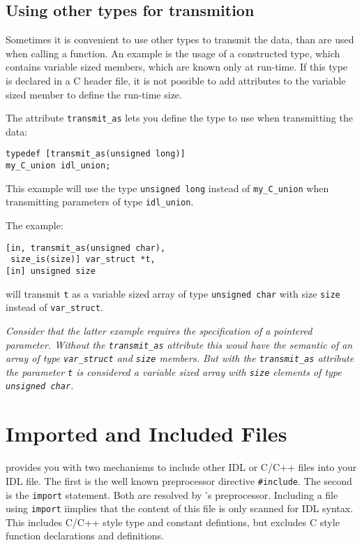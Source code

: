
\subsection{Using other types for transmition}
Sometimes it is convenient to use other types to transmit the data,
than are used when calling a function. An example is the usage of
a constructed type, which contains variable sized members, which
are known only at run-time. If this type is declared in a C header
file, it is not possible to add attributes to the variable sized
member to define the run-time size. 

The attribute \verb|transmit_as| lets you define the type to use
when transmitting the data:
\begin{verbatim}
typedef [transmit_as(unsigned long)] 
my_C_union idl_union;
\end{verbatim}
This example will use the type \verb|unsigned long| instead of
\verb|my_C_union| when transmitting parameters of type \verb|idl_union|.

The example:
\begin{verbatim}
[in, transmit_as(unsigned char),
 size_is(size)] var_struct *t,
[in] unsigned size
\end{verbatim}
will transmit \verb|t| as a variable sized array of type \verb|unsigned char|
with size \verb|size| instead of \verb|var_struct|.

{\em Consider that the latter example requires the specification of
a pointered parameter. Without the \verb|transmit_as| attribute this
woud have the semantic of an array of type \verb|var_struct| and
\verb|size| members. But with the \verb|transmit_as| attribute the
parameter \verb|t| is considered a variable sized array with 
\verb|size| elements of type \verb|unsigned char|.}

\section{Imported and Included Files}
\label{sec:import}

\dice{} provides you with two mechanisms to include other IDL or
C/C++ files into your IDL file. The first is the well known 
preprocessor directive \verb|#include|. The second is the \verb|import|
statement. Both are resolved by \dice{}'s preprocessor.
Including a file using \verb|import| iimplies that the content 
of this file is only scanned for IDL syntax. This includes
C/C++ style type and constant defintions, but excludes C style 
function declarations and definitions.

